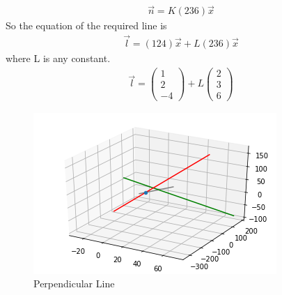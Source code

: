 \documentclass[journal,12pt,twocolumn]{IEEEtran}
\begin{document}
\begin{align}
 	\vec{n} = K(2 3 6)\vec{x}   
\end{align}
	So the equation of the required line is
\begin{align}
 \vec{l} =(1  2  4) \vec{x}  + L (2  3 6)\vec{x}   
\end{align}
   where L is any constant.
\begin{align}   
   \vec{l} =\begin{pmatrix} 1\\ 2\\ -4\end{pmatrix} + L
   \begin{pmatrix} 2 \\3\\ 6\end{pmatrix} 
\end{align}   
\begin{figure}[h]
    \centering
    \includegraphics[width = \columnwidth]{assignment1.png}
    \caption{Perpendicular Line }
    \label{fig:1}
\end{figure}
\end{document}
